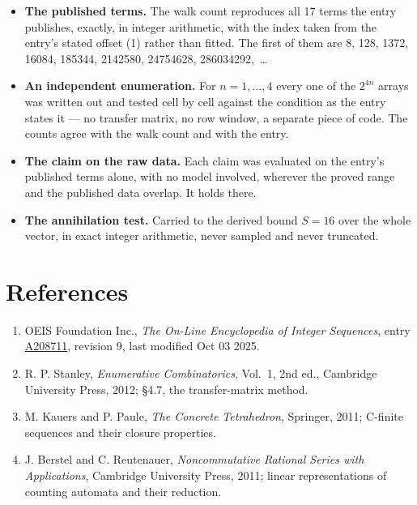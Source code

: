 \documentclass[11pt]{article}
\theoremstyle{definition}
\begin{document}
\begin{itemize}

\item {\bfseries The published terms.} The walk count reproduces all 17 terms the entry publishes, exactly, in integer arithmetic, with the index taken from the entry's stated offset (1) rather than fitted. The first of them are 8, 128, 1372, 16084, 185344, 2142580, 24754628, 286034292,~\dots

\item {\bfseries An independent enumeration.} For $n = 1,\dots,4$ every one of the $2^{4n}$ arrays was written out and tested cell by cell against the condition as the entry states it --- no transfer matrix, no row window, a separate piece of code. The counts agree with the walk count and with the entry.

\item {\bfseries The claim on the raw data.} Each claim was evaluated on the entry's published terms alone, with no model involved, wherever the proved range and the published data overlap. It holds there.

\item {\bfseries The annihilation test.} Carried to the derived bound $S = 16$ over the whole vector, in exact integer arithmetic, never sampled and never truncated.

\end{itemize}

\section{References}

\begin{enumerate}

\item OEIS Foundation Inc., \emph{The On-Line Encyclopedia of Integer Sequences}, entry \href{https://oeis.org/A208711}{A208711}, revision 9, last modified Oct 03 2025.

\item R. P. Stanley, \emph{Enumerative Combinatorics}, Vol.~1, 2nd ed., Cambridge University Press, 2012; \S4.7, the transfer-matrix method.

\item M. Kauers and P. Paule, \emph{The Concrete Tetrahedron}, Springer, 2011; C-finite sequences and their closure properties.

\item J. Berstel and C. Reutenauer, \emph{Noncommutative Rational Series with Applications}, Cambridge University Press, 2011; linear representations of counting automata and their reduction.

\end{enumerate}
\end{document}
